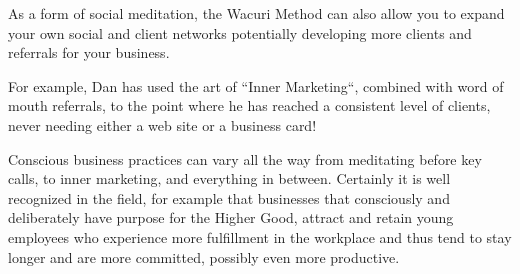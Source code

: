 \documentclass[12pt]{book}
\begin{document}
As a form of social meditation, the Wacuri Method can also allow you
to expand your own social and client networks potentially developing
more clients and referrals for your business.

For example, Dan has used the art of “Inner Marketing“, combined with
word of mouth referrals, to the point where he has reached a
consistent level of clients, never needing either a web site or a
business card!

Conscious business practices can vary all the way from meditating
before key calls, to inner marketing, and everything in
between. Certainly it is well recognized in the field, for example
that businesses that consciously and deliberately have purpose for the
Higher Good, attract and retain young employees who experience more
fulfillment in the workplace and thus tend to stay longer and are more
committed, possibly even more productive.




\begin{refsection}
\nocite{*}
\printbibliography
\end{refsection}
\nocite{*}


\appendix



  
\end{document}

